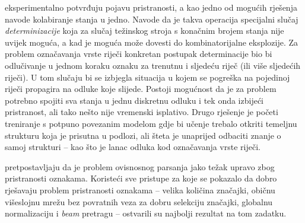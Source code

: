 \citet*{lafferty2001conditional} eksperimentalno potvrđuju pojavu pristranosti,
a kao jedno od mogućih rješenja navode kolabiranje stanja u jedno. Navode da je
takva operacija specijalni slučaj \emph{determinizacije} koja za slučaj
težinskog stroja s konačnim brojem stanja nije uvijek moguća, a kad je moguća
može dovesti do kombinatorijalne eksplozije. Za problem označavanja vrste riječi
konkretan postupak determinacije bio bi odlučivanje u jednom koraku oznaku za
trenutnu i sljedeću riječ (ili više sljedećih riječi). U tom slučaju bi se
izbjegla situacija u kojem se pogreška na pojedinoj riječi propagira na odluke
koje slijede. Postoji mogućnost da je za problem potrebno spojiti sva stanja u
jednu diskretnu odluku i tek onda izbijeći pristranost, ali tako nešto nije
vremenski isplativo. Drugo rješenje je početi treniranje s potpuno povezanim
modelom gdje bi učenje trebalo otkriti temeljnu strukturu koja je prisutna u
podlozi, ali šteta je unaprijed odbaciti znanje o samoj strukturi -- kao što je
lanac odluka kod označavanja vrste riječi.

\citet{andor2016globally} pretpostavljaju da je problem ovisnosnog parsanja jako
težak upravo zbog pristranosti oznakama. Koristeći sve pristupe za koje se
pokazalo da dobro rješavaju problem pristranosti oznakama -- velika količina
značajki, običnu višeslojnu mrežu bez povratnih veza za dobru selekciju
značajki, globalnu normalizaciju i \textit{beam} pretragu -- ostvarili su
najbolji rezultat na tom zadatku.
